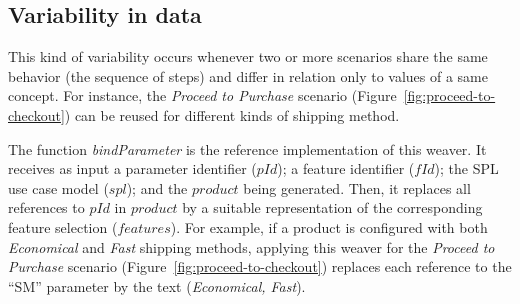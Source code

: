 \documentclass{sig-alt-full}
\begin{document}

\subsection{Variability in data}\label{sub:bind-weaver}

This kind of variability occurs whenever two or more scenarios share the same
behavior (the sequence of steps) and differ in relation only to values of a same
concept. For instance, the \emph{Proceed to Purchase} scenario
(Figure~\ref{fig:proceed-to-checkout}) can be reused for different kinds
of shipping method. 





The function \emph{bindParameter} is the reference implementation of 
this weaver. It receives as input 
a parameter identifier ($pId$); a feature identifier ($fId$); the SPL use case model ($spl$); and the
$product$ being generated. Then, it replaces all references to $pId$ in
$product$ by a suitable representation of the corresponding feature selection ($features$). For example, if a product is configured with both \emph{Economical} and \emph{Fast}
shipping methods, applying this weaver for the \emph{Proceed to
Purchase} scenario (Figure~\ref{fig:proceed-to-checkout}) replaces each reference to the ``SM'' parameter by
the text (\emph{Economical, Fast}).
\end{document}
